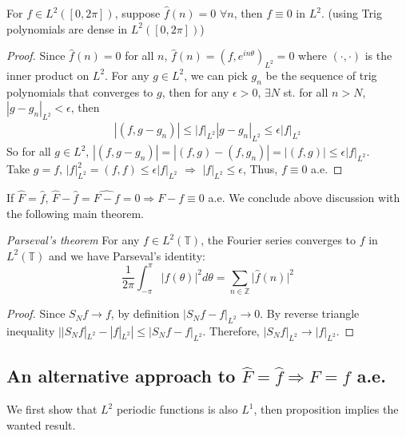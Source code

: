 \documentclass[12pt]{article}
\newenvironment{theorem}[1][Theorem.]{\begin{trivlist}
\item[\hskip \labelsep {\bfseries #1}]}{\end{trivlist}}
\newenvironment{proposition}[1][Proposition.]{\begin{trivlist}
\item[\hskip \labelsep {\bfseries #1}]}{\end{trivlist}}
\begin{document}
\begin{proposition} For $f \in L^2([0,2\pi])$, suppose $\hat{f}(n) = 0$ $\forall n $, then $f \equiv 0$ in $L^2$. (using Trig polynomials are dense in $L^2([0,2\pi])$)
\end{proposition}

\begin{proof}
Since $\hat{f}(n) = 0$ for all $n$, $\hat{f}(n) = (f,e^{in\theta})_{L^2} = 0$ where $ (\cdot, \cdot)$ is the inner product on $L^2$. For any $g \in L^2$, we can pick $g_n$ be the sequence of trig polynomials that converges to $g$, then for any $\epsilon > 0$, $\exists N$ st. for all $n > N$, $|g-g_n|_{L^2} < \epsilon$, then
\begin{align*}
|(f,g-g_n)| \leqslant |f|_{L^2}|g-g_n|_{L^2} \leqslant \epsilon |f|_{L^2}
\end{align*}
So for all $g \in L^2$, $|(f,g-g_n)| = |( f,g ) -(  f,g_n ) |= |( f,g )| \leqslant \epsilon |f|_{L^2}$. \\
Take $g = f$,  $|f|_{L^2}^2=( f,f )\leqslant \epsilon |f|_{L^2}$ $\Rightarrow$ $|f|_{L^2} \leqslant \epsilon$, Thus, $f \equiv 0$ a.e.
\end{proof}
If $\hat{F}=\hat{f}$, $\hat{F}-\hat{f} = \widehat{F-f} = 0  \Rightarrow F-f \equiv 0$ a.e. 
We conclude above discussion with the following main theorem.
\begin{theorem} \textit{Parseval's theorem}
For any $f \in L^2(\mathbb{T})$, the Fourier series converges to $f$ in $L^2(\mathbb{T})$ and we have Parseval's identity: 
\begin{equation}
\frac{1}{2\pi} \int_{-\pi}^{\pi} \lvert f(\theta) \lvert ^2 d\theta =  \sum\limits_{n \in \mathbb{Z}} \lvert \hat{f}(n)\lvert ^2
\end{equation}
\end{theorem}
\begin{proof}
Since $S_Nf \rightarrow f$, by definition $|S_Nf - f|_{L^2} \rightarrow 0$. By reverse triangle inequality $||S_Nf|_{L^2}-|f|_{L^2}| \leqslant |S_Nf - f|_{L^2}$. Therefore, $|S_Nf|_{L^2} \rightarrow |f|_{L^2}$.
\end{proof}

\subsection* {An alternative approach to $\hat{F} =\hat{f} \Rightarrow F = f$ a.e.}
We first show that $L^2$ periodic functions is also $L^1$, then proposition implies the wanted result.
\end{document}
